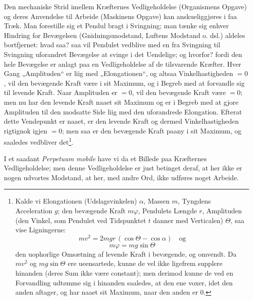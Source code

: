 \documentclass[11pt]{book}
\newcommand{\opage}[1]{\marginnote{\footnotesize\textit{[#1]}}}
\begin{document}
Den mechaniske Strid imellem Kræfternes Vedligeholdelse
(Organismens Opgave) og deres Anvendelse til Arbeide (Maskinens Opgave)
kan anskueliggjøres i faa Træk. Man forestille sig et Pendul bragt i
Svingning; man tænke sig enhver Hindring for Bevægelsen
(Gnidningsmodstand, Luftens Modstand o. dsl.) aldeles bortfjernet: hvad saa? saa
vil Pendulet vedblive med en fra Svingning til Svingning uforandret
Bevægelse at svinge i det Uendelige; og hvorfor? fordi den hele
Bevægelse er anlagt paa en Vedligeholdelse af de tilsvarende Kræfter.
Hver Gang „Amplituden“ er liig med „Elongationen“, og altsaa
Vinkelhastigheden $=0$, vil den bevægende Kraft være i sit Maximum, og i
Begreb med at forvandle sig til levende Kraft. Naar Amplituden er
$=0$, vil den bevægende Kraft være $=0$; men nu har den levende
Kraft naaet sit Maximum og er i Begreb med at gjore Amplituden til
den modsatte Side liig med den uforandrede Elongation. Efterat dette
Vendepunkt er naaet, er den levende Kraft og dermed Vinkelhastigheden
rigtignok igjen $=0$; men saa er den bevægende Kraft paany i sit
Maximum, og saaledes vedbliver det\footnote{Kalde vi Elongationen
(Udslagsvinkelen) $\alpha$, Massen $m$, Tyngdens Acceleration $g$; den
bevægende Kraft $m\varphi$, Pendulets Længde $r$, Amplituden (den Vinkel, som
Pendulet ved Tidspunktet $t$ danner med Verticalen) $\Theta$, saa vise
Ligningerne:
\[ mv^2 = 2mgr\,(\cos\Theta - \cos\alpha) \quad \text{og} \]
\[ m\varphi = mg\sin\Theta \]
den uophorlige Omsætning af levende Kraft i bevægende, og omvendt. Da
$mv^2$ og $mg\sin\Theta$ ere ueensartede, kunne de vel ikke ligefrem supplere
hinanden (deres Sum ikke være constant); men derimod kunne de ved en
Forvandling udtømme sig i hinanden saaledes, at den ene voxer, idet den
anden aftager, og har naaet sit Maximum, naar den anden er $0$.}.
\opage{354} \setcounter{footnote}{0}%

I et saadant \textit{Perpetuum mobile} have vi da et Billede paa
Kræfternes Vedligeholdelse; men denne Vedligeholdelse er just betinget
deraf, at her ikke er nogen udvortes Modstand, at her, med andre Ord,
ikke udføres noget Arbeide.
\end{document}
